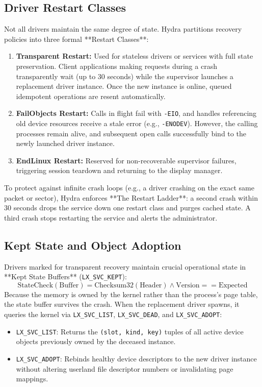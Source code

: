 \subsection{Driver Restart Classes}
Not all drivers maintain the same degree of state. Hydra partitions recovery policies into three formal **Restart Classes**:
\begin{enumerate}
    \item \textbf{Transparent Restart:} Used for stateless drivers or services with full state preservation. Client applications making requests during a crash transparently wait (up to 30 seconds) while the supervisor launches a replacement driver instance. Once the new instance is online, queued idempotent operations are resent automatically.
    \item \textbf{FailObjects Restart:} Calls in flight fail with \texttt{-EIO}, and handles referencing old device resources receive a stale error (e.g., \texttt{-ENODEV}). However, the calling processes remain alive, and subsequent open calls successfully bind to the newly launched driver instance.
    \item \textbf{EndLinux Restart:} Reserved for non-recoverable supervisor failures, triggering session teardown and returning to the display manager.
\end{enumerate}

To protect against infinite crash loops (e.g., a driver crashing on the exact same packet or sector), Hydra enforces **The Restart Ladder**: a second crash within 30 seconds drops the service down one restart class and purges cached state. A third crash stops restarting the service and alerts the administrator.

\subsection{Kept State and Object Adoption}
Drivers marked for transparent recovery maintain crucial operational state in **Kept State Buffers** (\texttt{LX\_SVC\_KEPT}):
\begin{equation}
\text{StateCheck}(\text{Buffer}) = \text{Checksum32}(\text{Header}) \land \text{Version} == \text{Expected}
\end{equation}
Because the memory is owned by the kernel rather than the process's page table, the state buffer survives the crash. When the replacement driver spawns, it queries the kernel via \texttt{LX\_SVC\_LIST}, \texttt{LX\_SVC\_DEAD}, and \texttt{LX\_SVC\_ADOPT}:
\begin{itemize}
    \item \texttt{LX\_SVC\_LIST}: Returns the \texttt{(slot, kind, key)} tuples of all active device objects previously owned by the deceased instance.
    \item \texttt{LX\_SVC\_ADOPT}: Rebinds healthy device descriptors to the new driver instance without altering userland file descriptor numbers or invalidating page mappings.
\end{itemize}

